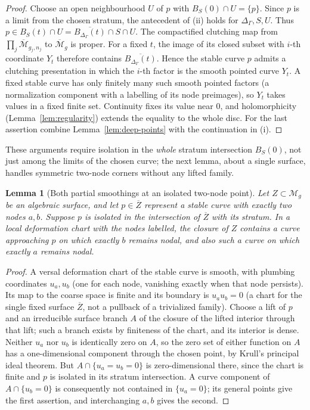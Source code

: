 \documentclass[12pt]{article}
\newcommand{\M}{\mathcal M}
\newcommand{\cl}[1]{\overline{#1}}
\newtheorem{lemma}[theorem]{Lemma}
\theoremstyle{remark}
\begin{document}
\begin{proof}
Choose an open neighbourhood \(U\) of \(p\) with
\(B_S(0)\cap U=\{p\}\). Since \(p\) is a limit from the chosen
stratum, the antecedent of (ii) holds for
\(\Delta_\Gamma,S,U\). Thus
\(p\in B_S(t)\cap U=\cl{B_{\Delta_\Gamma}(t)}\cap S\cap U\).
The compactified clutching map from
\(\prod_j\cl{\M}_{g_j,n_j}\) to \(\cl{\M}_g\) is proper. For a fixed \(t\),
the image of its closed subset with \(i\)-th coordinate \(Y_t\)
therefore contains \(\cl{B_{\Delta_\Gamma}(t)}\).
Hence the stable curve \(p\) admits a clutching presentation in
which the \(i\)-th factor is the smooth pointed curve \(Y_t\).
A fixed stable curve has only finitely many such smooth pointed
factors (a normalization component with a labelling of its node
preimages), so \(Y_t\) takes values in a fixed finite set.
Continuity fixes its value near \(0\), and holomorphicity
(Lemma~\ref{lem:regularity}) extends the equality to the whole disc.
For the last assertion combine Lemma~\ref{lem:deep-points} with the
continuation in (i).
\end{proof}

These arguments require isolation in the \emph{whole} stratum
intersection \(B_S(0)\), not just among the limits of the chosen
curve; the next lemma, about a single surface, handles symmetric
two-node corners without any lifted family.

\begin{lemma}[Both partial smoothings at an isolated two-node point]
\label{lem:plumbing}
Let \(Z\subset\M_g\) be an algebraic surface, and let
\(p\in\cl Z\) represent a stable curve with exactly two nodes \(a,b\).
Suppose \(p\) is isolated in the intersection of \(\cl Z\) with its
stratum. In a local deformation chart with the nodes labelled, the
closure of \(Z\) contains a curve approaching \(p\) on which exactly
\(b\) remains nodal, and also such a curve on which exactly
\(a\) remains nodal.
\end{lemma}

\begin{proof}
A versal deformation chart of the stable curve is smooth,
with plumbing coordinates \(u_a,u_b\) (one for each node, vanishing
exactly when that node persists). Its map to the coarse space
is finite and its boundary is \(u_a u_b=0\)
\cite[Sections 8--10, Proposition 12.2 and Corollary 12.3]{HubbardKoch}
(a chart for the single fixed surface \(\cl Z\), not a pullback of a
trivialized family). Choose a lift of \(p\) and an irreducible surface branch \(A\)
of the closure of the lifted interior through that lift; such a
branch exists by finiteness of the chart, and its interior is dense.
Neither \(u_a\) nor \(u_b\) is identically zero on \(A\), so
the zero set of either function on \(A\) has a one-dimensional
component through the chosen point, by Krull's principal ideal
theorem. But \(A\cap\{u_a=u_b=0\}\)
is zero-dimensional there, since the chart is finite and \(p\) is
isolated in its stratum intersection. A curve component of
\(A\cap\{u_b=0\}\) is consequently not contained in \(\{u_a=0\}\);
its general points give the first assertion, and interchanging
\(a,b\) gives the second.
\end{proof}
\end{document}
